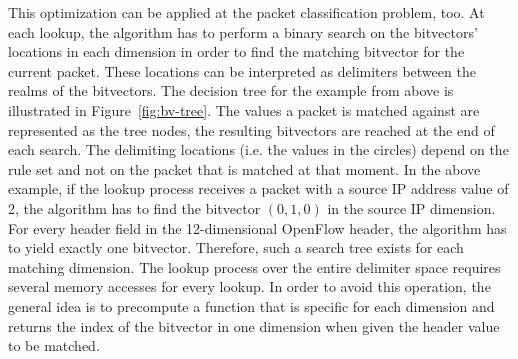 \documentclass[a4paper,
		12pt,
		parskip=full,
		titlepage
		]{scrartcl}
\begin{document}
This optimization can be applied at the packet classification problem, too.
At each lookup, the algorithm has to perform a binary search on the bitvectors' 
locations in each dimension in order to find the matching bitvector for the current packet.
These locations can be interpreted as delimiters between the realms of the bitvectors.
The decision tree for the example from above is illustrated in Figure~\ref{fig:bv-tree}.
The values a packet is matched against are represented as the tree nodes, 
the resulting bitvectors are reached at the end of each search. 
The delimiting locations (i.e. the values in the circles) depend on the 
rule set and not on the packet that is matched at that moment.
In the above example, if the lookup process receives a packet with a source IP 
address value of 2, the algorithm has to find the bitvector $(0, 1, 0)$ in the source IP dimension.
For every header field in the 12-dimensional OpenFlow header, the algorithm has to yield exactly one bitvector.
Therefore, such a search tree exists for each matching dimension.
The lookup process over the entire delimiter space requires several memory accesses for every lookup.
In order to avoid this operation, the general idea is to precompute a function that 
is specific for each dimension and returns the index of the bitvector in one 
dimension when given the header value to be matched.
\end{document}
